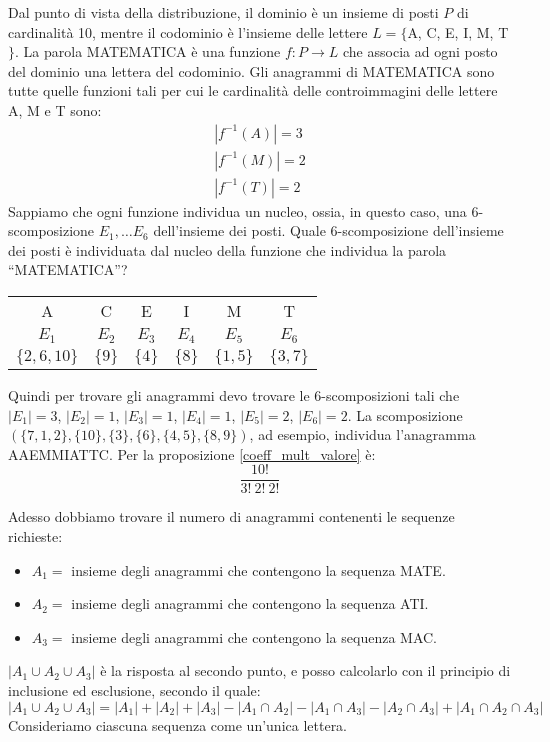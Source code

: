Dal punto di vista della distribuzione, il dominio \`e un insieme di posti $P$ di cardinalit\`a 10, mentre il codominio \`e l'insieme delle lettere $L = \{ $A, C, E, I, M, T$\}$. La parola MATEMATICA \`e una funzione $f : P \to L $ che associa ad ogni posto del dominio una lettera del codominio. Gli anagrammi di MATEMATICA sono tutte quelle funzioni tali per cui le cardinalit\`a delle controimmagini delle lettere A, M e T sono: 
\begin{align*}
|f^{-1}(A)| = 3 \\ 
|f^{-1}(M)| = 2 \\
|f^{-1}(T)| = 2
\end{align*}
Sappiamo che ogni funzione individua un nucleo, ossia, in questo caso, una $6$-scomposizione $E_1, \dots E_6$ dell'insieme dei posti. Quale $6$-scomposizione dell'insieme dei posti \`e individuata dal nucleo della funzione che individua la parola ``MATEMATICA''?

\begin{tabular}{c|c|c|c|c|c}
A & C & E & I & M & T \\
$E_1$ & $E_2$ & $E_3$ & $E_4$ & $E_5$ & $E_6$ \\
$\{2, 6, 10\}$ & $\{9\}$ & $\{4\}$ & $\{8\}$ & $\{1,5\}$ & $\{3,7\}$ 
\end{tabular}

Quindi per trovare gli anagrammi devo trovare le $6$-scomposizioni tali che $|E_1| = 3$, $|E_2| = 1$, $|E_3| = 1$, $|E_4| = 1$, $|E_5| = 2$, $|E_6| = 2$. La scomposizione $( \{ 7, 1, 2\}, \{ 10\}, \{3\}, \{ 6\}, \{4, 5\}, \{8,9\})$, ad esempio, individua l'anagramma AAEMMIATTC. Per la proposizione \ref{coeff_mult_valore} \`e:
\[
\frac{10!}{3! \ 2! \ 2!}
\]

Adesso dobbiamo trovare il numero di anagrammi contenenti le sequenze richieste:
\begin{itemize}
  \item $A_1 = $ insieme degli anagrammi che contengono la sequenza MATE.
  \item $A_2 = $ insieme degli anagrammi che contengono la sequenza ATI.
  \item $A_3 = $ insieme degli anagrammi che contengono la sequenza MAC.
\end{itemize}
$|A_1 \cup A_2 \cup A_3|$ \`e la risposta al secondo punto, e posso calcolarlo con il principio di inclusione ed esclusione, secondo il quale:
\[
|A_1 \cup A_2 \cup A_3| = |A_1| + |A_2| + |A_3| - |A_1 \cap A_2| - |A_1 \cap A_3| - |A_2 \cap A_3| + |A_1 \cap A_2 \cap A_3|
\]
Consideriamo ciascuna sequenza come un'unica lettera. 

